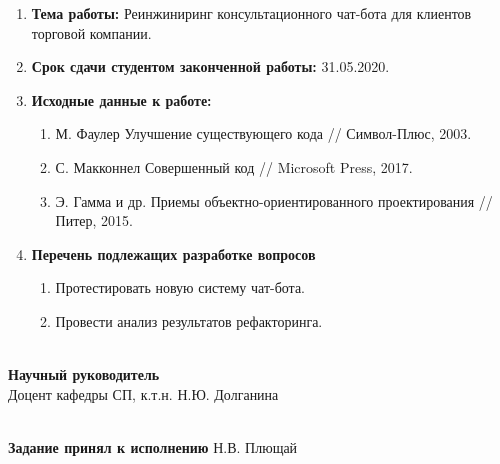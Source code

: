 \begin{titlepage}
    \begin{enumerate}
        \item \textbf{Тема работы:}
        Реинжиниринг консультационного чат-бота для клиентов торговой компании.
        \item \textbf{Срок сдачи студентом законченной работы:} 31.05.2020.
        \item \textbf{Исходные данные к работе:}
        \begin{enumerate}
            \item М. Фаулер Улучшение существующего кода // Символ-Плюс, 2003.
            \item С. Макконнел Совершенный код // Microsoft Press, 2017.
            \item Э. Гамма и др. Приемы объектно-ориентированного проектирования // Питер, 2015.
        \end{enumerate}
        \item \textbf{Перечень подлежащих разработке вопросов}
        \begin{enumerate}
            \item Протестировать новую систему чат-бота.
            \item Провести анализ результатов рефакторинга.
        \end{enumerate}
    \end{enumerate}

    \noindent\\
    \textbf{Научный руководитель}\\
    Доцент кафедры СП, к.т.н. \hfill Н.Ю. Долганина
    
    \noindent\\
    \textbf{Задание принял к исполнению} \hfill Н.В. Плющай

    \thispagestyle{empty}
\end{titlepage}